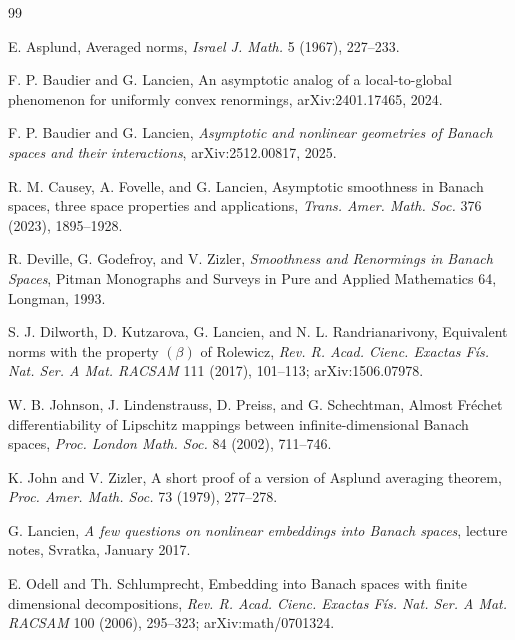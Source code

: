 \documentclass[11pt]{article}
\theoremstyle{definition}
\theoremstyle{remark}
\begin{document}
\begin{thebibliography}{99}

E. Asplund,
\newblock Averaged norms,
\newblock \emph{Israel J. Math.} 5 (1967), 227--233.

F. P. Baudier and G. Lancien,
\newblock An asymptotic analog of a local-to-global phenomenon for uniformly convex renormings,
\newblock arXiv:2401.17465, 2024.

F. P. Baudier and G. Lancien,
\newblock \emph{Asymptotic and nonlinear geometries of Banach spaces and their interactions},
\newblock arXiv:2512.00817, 2025.

R. M. Causey, A. Fovelle, and G. Lancien,
\newblock Asymptotic smoothness in Banach spaces, three space properties and applications,
\newblock \emph{Trans. Amer. Math. Soc.} 376 (2023), 1895--1928.

R. Deville, G. Godefroy, and V. Zizler,
\newblock \emph{Smoothness and Renormings in Banach Spaces},
\newblock Pitman Monographs and Surveys in Pure and Applied Mathematics 64,
Longman, 1993.

S. J. Dilworth, D. Kutzarova, G. Lancien, and N. L. Randrianarivony,
\newblock Equivalent norms with the property $(\beta)$ of Rolewicz,
\newblock \emph{Rev. R. Acad. Cienc. Exactas F\'is. Nat. Ser. A Mat. RACSAM}
111 (2017), 101--113; arXiv:1506.07978.

W. B. Johnson, J. Lindenstrauss, D. Preiss, and G. Schechtman,
\newblock Almost Fr\'echet differentiability of Lipschitz mappings between infinite-dimensional Banach spaces,
\newblock \emph{Proc. London Math. Soc.} 84 (2002), 711--746.

K. John and V. Zizler,
\newblock A short proof of a version of Asplund averaging theorem,
\newblock \emph{Proc. Amer. Math. Soc.} 73 (1979), 277--278.

G. Lancien,
\newblock \emph{A few questions on nonlinear embeddings into Banach spaces},
\newblock lecture notes, Svratka, January 2017.

E. Odell and Th. Schlumprecht,
\newblock Embedding into Banach spaces with finite dimensional decompositions,
\newblock \emph{Rev. R. Acad. Cienc. Exactas F\'is. Nat. Ser. A Mat. RACSAM}
100 (2006), 295--323; arXiv:math/0701324.

\end{thebibliography}
\end{document}
